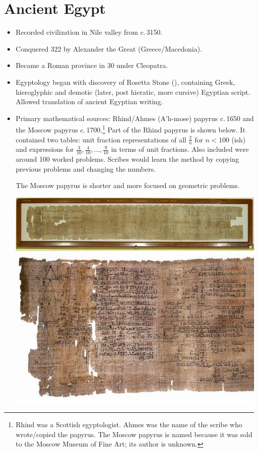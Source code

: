 \graphicspath{{1egypt/pics/}}

\section{Ancient Egypt}


\begin{itemize}\itemsep0pt
  \item Recorded civilization in Nile valley from c.\,3150\BC.
  \item Conquered 322\BC{} by Alexander the Great (Greece/Macedonia).
  \item Became a Roman province in 30\BC{} under Cleopatra. 
  \item Egyptology began with discovery of Rosetta Stone (), containing Greek, hieroglyphic and demotic (later, post hieratic, more cursive) Egyptian script. Allowed translation of ancient Egyptian writing.
  \item Primary mathematical sources: Rhind/Ahmes (A'h-mose) papyrus c.\,1650\BC{} and the Moscow papyrus c.\,1700\BC.\footnote{Rhind was a Scottish egyptologist. Ahmes was the name of the scribe who wrote/copied the papyrus. The Moscow papyrus is named because it was sold to the Moscow Museum of Fine Art; its author is unknown.} Part of the Rhind papyrus is shown below. It contained two tables: unit fraction representations of all $\frac 2n$ for $n<100$ (ish) and expressions for $\frac 3{10},\frac 4{10},\ldots,\frac 9{10}$ in terms of unit fractions. Also included were around 100 worked problems. Scribes would learn the method by copying previous problems and changing the numbers.\par
  The Moscow papyrus is shorter and more focused on geometric problems.
  \begin{center}
  	\includegraphics[scale=0.4]{rhindwhole.jpg}\\
  	\includegraphics[scale=0.8]{Rhind_Mathematical_Papyrus.jpg}

\end{center}
\end{itemize}

